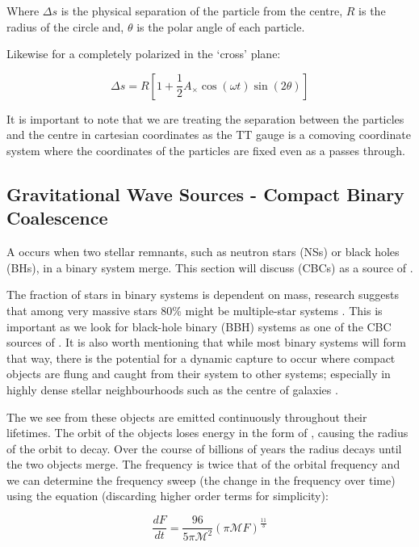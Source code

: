 Where $\Delta s$ is the physical separation of the particle from the centre, $R$ is the radius of the circle and, $\theta$ is the polar angle of each particle.

Likewise for a \gw completely polarized in the `cross' plane:

\begin{equation}
   \Delta s = R[1 + \frac{1}{2} A_{\times} \cos(\omega t) \sin(2 \theta)]
   \label{eqn:cross_separation}
\end{equation}

It is important to note that we are treating the separation between the particles and the centre in cartesian coordinates as the TT gauge is a comoving coordinate system where the coordinates of the particles are fixed
even as a \gw passes through.

\subsection{\label{sec:CBC}Gravitational Wave Sources - Compact Binary Coalescence}

A \cbc occurs when two stellar remnants, such as neutron stars (NSs) or black holes (BHs), in a binary system merge. This section will discuss \cbcs (CBCs) as a source of \gws.

The fraction of stars in binary systems is dependent on mass, research suggests that among very massive stars 80\% might be multiple-star systems \cite{binary_fraction}. This is important as we look for black-hole binary (BBH) systems as one of the CBC sources of \gws. It is also worth mentioning that while most binary systems will form that way, there is the potential for a dynamic capture to occur where compact objects are flung and caught from
their system to other systems; especially in highly dense stellar neighbourhoods such as the centre of galaxies \cite{dynamic_capture}.

The \gws we see from these objects are emitted continuously throughout their lifetimes. The orbit of the objects loses energy in the form of \gws, causing the radius of the orbit to decay. Over the course of billions of years the radius decays until the two objects merge. The \gw frequency is twice that of the orbital frequency \cite{kip_book} and we can determine the frequency sweep (the change in the frequency over time) using the equation (discarding higher order terms for simplicity):

\begin{equation}
   \frac{dF}{dt} = \frac{96}{5 \pi \mathcal{M}^2} (\pi \mathcal{M} F)^{\frac{11}{3}}
   \label{eqn:frequency_sweep}
\end{equation}

